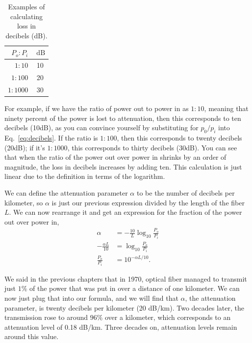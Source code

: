 \begin{table}
\centering
\begin{tabular}{r|c}
$P_o: P_i$ & $\mathrm{~dB}$ \\
\hline $1: 10$ & 10 \\
$1: 100$ & 20 \\
$1: 1000$ & 30
\end{tabular}
\caption{Examples of calculating loss in decibels (dB).}
\label{tab:decibels}
\end{table}

For example, if we have the ratio of power out to power in as $1:10$, meaning that ninety percent of the power is lost to attenuation, then this corresponds to ten decibels (10dB), as you can convince yourself by substituting for $p_0/p_i$ into Eq.~\ref{eq:decibels}. If the ratio is $1:100$, then this corresponds to twenty decibels (20dB); if it's $1:1000$, this corresponds to thirty decibels (30dB). You can see that when the ratio of the power out over power in shrinks by an order of magnitude, the loss in decibels increases by adding ten. This calculation is just linear due to the definition in terms of the logarithm.

We can define the attenuation parameter $\alpha$ to be the number of decibels per kilometer, so $\alpha$ is just our previous expression divided by the length of the fiber $L$. We can now rearrange it and get an expression for the fraction of the power out over power in,
\begin{equation}
\begin{aligned}
\alpha & =-\frac{10}{L} \log _{10} \frac{P_o}{P_i} \\
-\frac{\alpha L}{10} & =\log _{10} \frac{P_o}{P_i} \\
\frac{P_o}{P_i} & =10^{-\alpha L / 10}.
\end{aligned}
\end{equation}

We said in the previous chapters that in 1970, optical fiber managed to transmit just $1\%$ of the power that was put in over a distance of one kilometer. We can now just plug that into our formula, and we will find that $\alpha$, the attenuation parameter, is twenty decibels per kilometer (20 dB/km). Two decades later, the transmission rose to around $96\%$ over a kilometer, which corresponds to an attenuation level of 0.18 dB/km. Three decades on, attenuation levels remain around this value.

